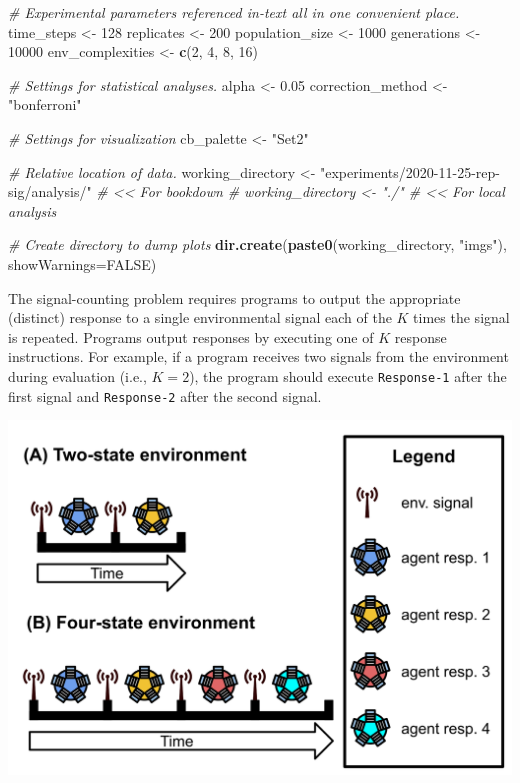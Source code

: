 \documentclass[]{book}
\newenvironment{Shaded}{\begin{snugshade}}{\end{snugshade}}
\newcommand{\CommentTok}[1]{\textcolor[rgb]{0.56,0.35,0.01}{\textit{#1}}}
\newcommand{\DataTypeTok}[1]{\textcolor[rgb]{0.13,0.29,0.53}{#1}}
\newcommand{\DecValTok}[1]{\textcolor[rgb]{0.00,0.00,0.81}{#1}}
\newcommand{\FloatTok}[1]{\textcolor[rgb]{0.00,0.00,0.81}{#1}}
\newcommand{\KeywordTok}[1]{\textcolor[rgb]{0.13,0.29,0.53}{\textbf{#1}}}
\newcommand{\NormalTok}[1]{#1}
\newcommand{\OtherTok}[1]{\textcolor[rgb]{0.56,0.35,0.01}{#1}}
\newcommand{\StringTok}[1]{\textcolor[rgb]{0.31,0.60,0.02}{#1}}
\begin{document}
\begin{Shaded}
\begin{Highlighting}[]
\CommentTok{# Experimental parameters referenced in-text all in one convenient place.}
\NormalTok{time_steps <-}\StringTok{ }\DecValTok{128}
\NormalTok{replicates <-}\StringTok{ }\DecValTok{200}
\NormalTok{population_size <-}\StringTok{ }\DecValTok{1000}
\NormalTok{generations <-}\StringTok{ }\DecValTok{10000}
\NormalTok{env_complexities <-}\StringTok{ }\KeywordTok{c}\NormalTok{(}\DecValTok{2}\NormalTok{, }\DecValTok{4}\NormalTok{, }\DecValTok{8}\NormalTok{, }\DecValTok{16}\NormalTok{)}

\CommentTok{# Settings for statistical analyses.}
\NormalTok{alpha <-}\StringTok{ }\FloatTok{0.05}
\NormalTok{correction_method <-}\StringTok{ "bonferroni"}

\CommentTok{# Settings for visualization}
\NormalTok{cb_palette <-}\StringTok{ "Set2"}

\CommentTok{# Relative location of data.}
\NormalTok{working_directory <-}\StringTok{ "experiments/2020-11-25-rep-sig/analysis/"} \CommentTok{# << For bookdown}
\CommentTok{# working_directory <- "./"                                     # << For local analysis}

\CommentTok{# Create directory to dump plots}
\KeywordTok{dir.create}\NormalTok{(}\KeywordTok{paste0}\NormalTok{(working_directory, }\StringTok{"imgs"}\NormalTok{), }\DataTypeTok{showWarnings=}\OtherTok{FALSE}\NormalTok{)}
\end{Highlighting}
\end{Shaded}

The signal-counting problem requires programs to output the appropriate (distinct) response to a single environmental signal each of the \(K\) times the signal is repeated.
Programs output responses by executing one of \(K\) response instructions.
For example, if a program receives two signals from the environment during evaluation (i.e., \(K=2\)), the program should execute \texttt{Response-1} after the first signal and \texttt{Response-2} after the second signal.

\includegraphics{experiments/2020-11-25-rep-sig/analysis/../../../media/signal-counting-task.png}
\end{document}
